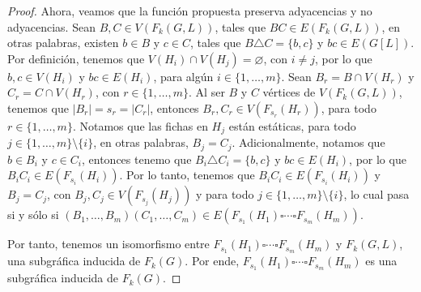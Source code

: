 \begin{proof}
    Ahora, veamos que la funci\'on propuesta preserva adyacencias y no
    adyacencias. Sean $B, C \in V(F_k(G,L))$, tales que $BC \in E(F_k(G,L))$, en
    otras palabras, existen $b \in B$ y $c \in C$, tales que $B \triangle C =
    \{b, c\}$ y $bc \in E(G[L])$. Por definici\'on, tenemos que $V(H_i) \cap
    V(H_j) = \varnothing$, con $i \neq j$, por lo que $b, c \in V(H_i)$ y $bc
    \in E(H_i)$, para alg\'un $i \in \{1, \dots, m\}$. Sean $B_r = B \cap
    V(H_r)$ y $C_r=C \cap V(H_r)$, con $r \in \{1, \dots, m\}$. Al ser $B$ y $C$
    v\'ertices de $V(F_k(G,L))$, tenemos que $|B_r|=s_r = |C_r|$, entonces $B_r,
    C_r \in V(F_{s_r}(H_r))$, para todo $r \in \{1, \dots, m\}$. Notamos que las
    fichas en $H_j$ est\'an est\'aticas, para todo $j \in \{1, \dots, m\}
    \setminus \{i\}$, en otras palabras, $B_j = C_j$. Adicionalmente, notamos
    que $b \in B_i$ y $c \in C_i$, entonces tenemo que $B_i \triangle C_i
    =\{b,c\}$ y $bc \in E(H_i)$, por lo que $B_i C_i \in E(F_{s_i}(H_i))$. Por
    lo tanto, tenemos que $B_i C_i \in E(F_{s_i}(H_i))$ y $B_j = C_j$, con $B_j,
    C_j \in V(F_{s_j}(H_j))$ y para todo $j \in \{1, \dots, m\} \setminus \{i\}$,
    lo cual pasa si y s\'olo si $(B_1, \dots, B_m)(C_1, \dots, C_m)\in
    E(F_{s_1}(H_1) \square \cdots \square F_{s_m}(H_m))$.

    Por tanto, tenemos un isomorfismo entre $F_{s_1}(H_1) \square \cdots
    \square F_{s_m}(H_m)$ y $F_k(G,L)$, una subgr\'afica inducida de $F_k(G)$.
    Por ende, $F_{s_1}(H_1) \square \cdots \square F_{s_m}(H_m)$ es una
    subgr\'afica inducida de $F_k(G)$.
\end{proof}

